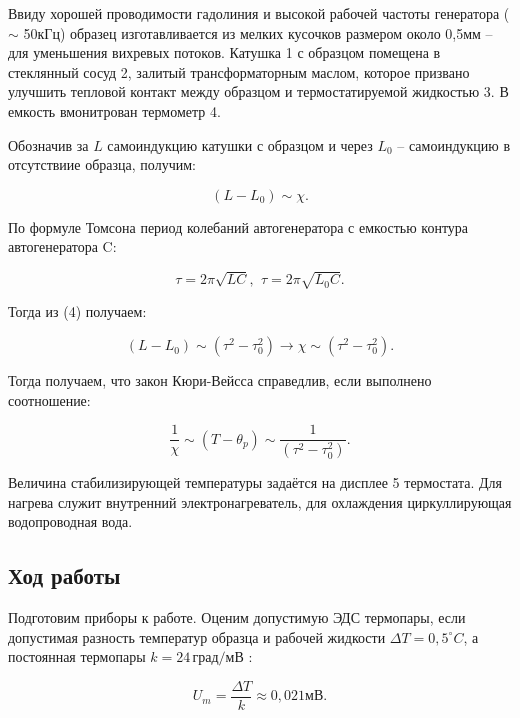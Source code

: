 \documentclass[a4paper, fontsize = 14pt]{article}
\begin{document}
Ввиду хорошей проводимости гадолиния и высокой рабочей частоты генератора ($\sim$ 50кГц) образец изготавливается из мелких кусочков размером около 0,5мм -- для уменьшения вихревых потоков. Катушка 1 с образцом помещена в стеклянный сосуд 2, залитый трансформаторным маслом, которое призвано улучшить тепловой контакт между образцом и термостатируемой жидкостью 3. В емкость вмонитрован термометр 4.

Обозначив за $L$ самоиндукцию катушки с образцом и через $L_0$ -- самоиндукцию в отсутствиие образца, получим:

\begin{equation}
    (L-L_0) \sim \chi.    
\end{equation}

По формуле Томсона период колебаний автогенератора с емкостью контура автогенератора C:

\begin{equation}
    \tau = 2 \pi \sqrt{LC}, \,\
    \tau = 2 \pi \sqrt{L_0C}.
\end{equation}

Тогда из (4) получаем:

\begin{equation}
    (L - L_0) \sim (\tau^2 - \tau_0^2) \longrightarrow \chi \sim (\tau^2 - \tau_0^2).
\end{equation}

Тогда получаем, что закон Кюри-Вейсса справедлив, если выполнено соотношение:

\begin{equation}
    \frac{1}{\chi} \sim (T - \theta_p) \sim \frac{1}{(\tau^2 - \tau_0^2)}.
\end{equation}

Величина стабилизирующей температуры задаётся на дисплее 5 термостата. Для нагрева служит внутренний электронагреватель, для охлаждения циркуллирующая водопроводная вода. 

\subsection*{Ход работы}

Подготовим приборы к работе. Оценим допустимую ЭДС термопары, если допустимая разность температур образца и рабочей жидкости $\Delta T = 0,5 ^\circ C$, а постоянная термопары $k = 24 \, град/мВ$ :

\begin{equation}
    U_m = \frac{\Delta T}{k} \approx 0,021мВ.
\end{equation}
\end{document}
